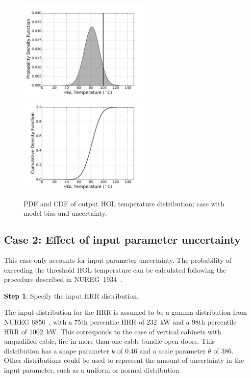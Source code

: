 \documentclass[12pt]{article}
\begin{document}
\begin{figure}[p]
\includegraphics[width=2.6in]{Figures/output_PDF_1_model}
\includegraphics[width=2.6in]{Figures/output_CDF_1_model}
\caption{PDF and CDF of output HGL temperature distribution; case with model bias and uncertainty.}
\label{fig:case_1_output_distributions}
\end{figure}


\clearpage


\subsection{Case 2: Effect of input parameter uncertainty}

This case only accounts for input parameter uncertainty. The probability of exceeding the threshold HGL temperature can be calculated following the procedure described in NUREG~1934~\cite{NUREG_1934}.

\textbf{Step 1}: Specify the input HRR distribution.

The input distribution for the HRR is assumed to be a gamma distribution from NUREG 6850~\cite{NUREG_6850}, with a 75th percentile HRR of 232~kW and a 98th percentile HRR of 1002~kW. This corresponds to the case of vertical cabinets with unqualified cable, fire in more than one cable bundle open doors. This distribution has a shape parameter $k$ of 0.46 and a scale parameter $\theta$ of 386. Other distributions could be used to represent the amount of uncertainty in the input parameter, such as a uniform or normal distribution.
\end{document}
